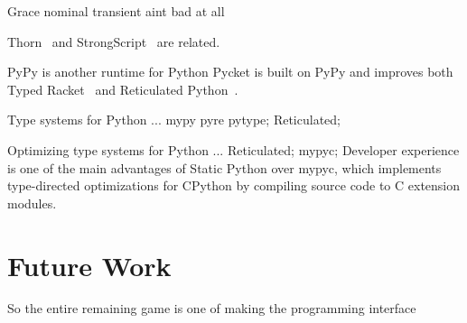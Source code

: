 \documentclass[english,cleveref,submission]{programming}
\newcommand{\SP}{Static Python}
\begin{document}
Grace nominal transient aint bad at all

Thorn~\cite{wnlov-popl-2010} and StrongScript~\cite{rzv-ecoop-2015} are related.

PyPy is another runtime for Python
Pycket is built on PyPy and improves both Typed Racket~\cite{bbst-oopsla-2017}
and Reticulated Python~\cite{vsc-dls-2019}.

Type systems for Python ...
mypy pyre pytype;
Reticulated;

Optimizing type systems for Python ...
Reticulated;
mypyc;
Developer experience is one of the main advantages of \SP{} over mypyc,
which implements type-directed optimizations for CPython
by compiling source code to C extension modules.



\section{Future Work}
\label{s:future}




       So the entire remaining game is one of making the programming interface
\end{document}

